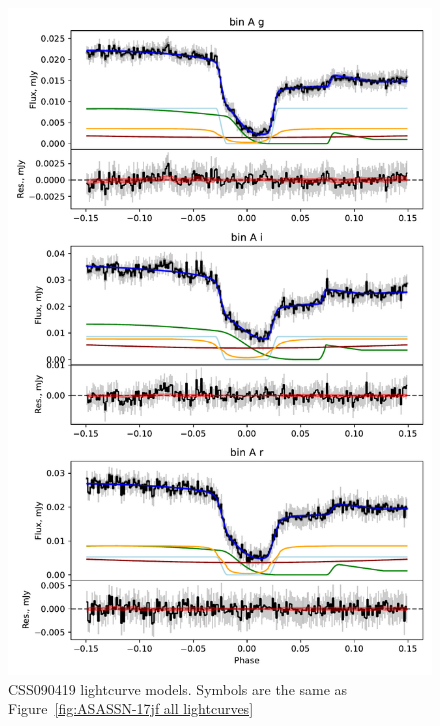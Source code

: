 \begin{figure}
    \centering
    \includegraphics[width=\textwidth]{figures/results/CSS090419/CSS090419_1.pdf}
    \caption{CSS090419 lightcurve models. Symbols are the same as Figure~\ref{fig:ASASSN-17jf all lightcurves}}
    \label{fig:CSS090419 all lightcurves}
\end{figure}
